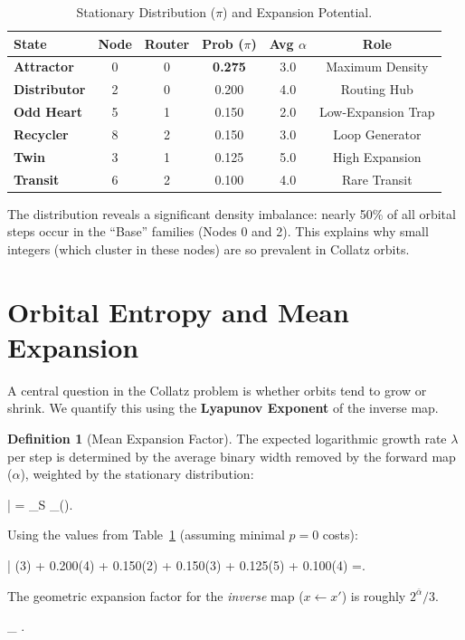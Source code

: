 \documentclass[11pt,letterpaper]{amsart}
\def\[{ }%
\def\]{ }%
\theoremstyle{definition}
\newtheorem{definition}{Definition}
\theoremstyle{plain}
\theoremstyle{plain}
\theoremstyle{remark}
\begin{document}
\begin{table}[H]
\centering
\caption{Stationary Distribution ($\pi$) and Expansion Potential.}
\label{tab:stationary}
\begin{tabular}{@{}l c c c c c@{}}
\toprule
\textbf{State} & \textbf{Node} & \textbf{Router} & \textbf{Prob ($\pi$)} & \textbf{Avg $\alpha$} & \textbf{Role} \\
\midrule
\textbf{Attractor} & 0 & 0 & \textbf{0.275} & 3.0 & Maximum Density \\
\textbf{Distributor} & 2 & 0 & 0.200 & 4.0 & Routing Hub \\
\textbf{Odd Heart} & 5 & 1 & 0.150 & 2.0 & Low-Expansion Trap \\
\textbf{Recycler} & 8 & 2 & 0.150 & 3.0 & Loop Generator \\
\textbf{Twin} & 3 & 1 & 0.125 & 5.0 & High Expansion \\
\textbf{Transit} & 6 & 2 & 0.100 & 4.0 & Rare Transit \\
\bottomrule
\end{tabular}
\end{table}

The distribution reveals a significant density imbalance: nearly 50\% of all orbital steps occur in the ``Base'' families (Nodes 0 and 2). This explains why small integers (which cluster in these nodes) are so prevalent in Collatz orbits.

\section{Orbital Entropy and Mean Expansion}

A central question in the Collatz problem is whether orbits tend to grow or shrink. We quantify this using the \textbf{Lyapunov Exponent} of the inverse map.

\begin{definition}[Mean Expansion Factor]
The expected logarithmic growth rate $\lambda$ per step is determined by the average binary width removed by the forward map ($\alpha$), weighted by the stationary distribution:
\[
\bar{\alpha} \;=\; \sum_{\rho \in S} \pi_\rho \cdot \alpha(\rho).
\]
\end{definition}

Using the values from Table~\ref{tab:stationary} (assuming minimal $p=0$ costs):
\[
\bar{\alpha} \;\approx{}(3) + 0.200(4) + 0.150(2) + 0.150(3) + 0.125(5) + 0.100(4) \;=.
\]
The geometric expansion factor for the \emph{inverse} map ($x \leftarrow x'$) is roughly $2^{\bar{\alpha}}/3$.
\[
\Lambda_{} \;\approx\;  \;\approx\;  \;\approx{}.
\]
\end{document}
